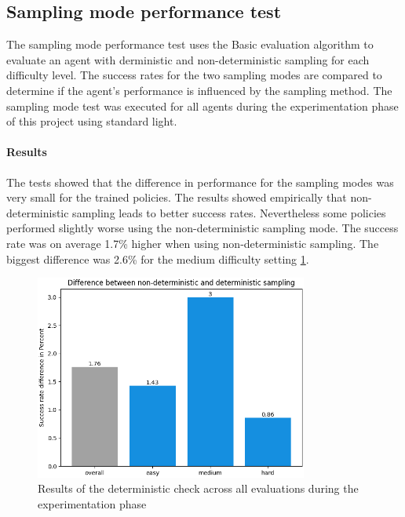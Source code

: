\subsection{Sampling mode performance test}
\label{ref:sampling_mode_test_results}

The sampling mode performance test uses the Basic evaluation algorithm to evaluate an agent with derministic and non-deterministic sampling for each difficulty level. The success rates for the two sampling modes are compared to determine if the agent's performance is influenced by the sampling method. The sampling mode test was executed for all agents during the experimentation phase of this project using standard light.

\paragraph{Results}
The tests showed that the difference in performance for the sampling modes was very small for the trained policies. The results showed empirically that non-deterministic sampling leads to better success rates. Nevertheless some policies performed slightly worse using the non-deterministic sampling mode. The success rate was on average 1.7\% higher when using non-deterministic sampling. The biggest difference was 2.6\% for the medium difficulty setting \ref{fig:deterministic_check_result}.

\begin{figure}
    \centering
    \includegraphics[width=0.8\textwidth]{Bilder/notebook_images/deterministic_check_results.png}
    \caption{Results of the deterministic check across all evaluations during the experimentation phase}
    \label{fig:deterministic_check_result}
\end{figure}

